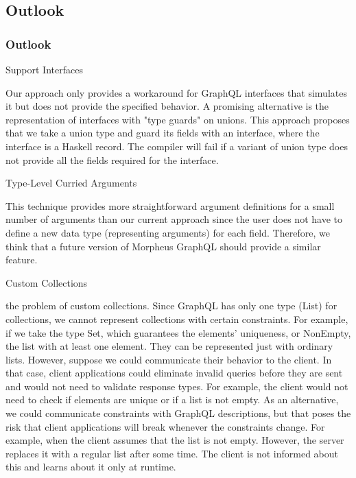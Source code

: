 \subsection{Outlook}
\begin{frame}\frametitle{Outlook}

\begin{block}{Support Interfaces}

Our approach only provides a workaround for GraphQL interfaces that simulates it but does not provide the specified behavior. 
A promising alternative is the representation of interfaces with "type guards" on unions. This approach proposes that we take a union type and guard its fields with an interface, where the interface is a Haskell record. The compiler will fail if a variant of union type does not provide all the fields required for the interface.

\end{block}

\begin{block}{Type-Level Curried Arguments}

This technique provides more straightforward argument definitions for a small number of arguments than our current approach since the user does not have to define a new data type (representing arguments) for each field. Therefore, we think that a future version of Morpheus GraphQL should provide a similar feature. 

\end{block}

\begin{block}{Custom Collections}

the problem of custom collections. Since GraphQL has only one type (List) for collections, we cannot represent collections with certain constraints. For example, if we take the type Set, which guarantees the elements' uniqueness, or NonEmpty, the list with at least one element. They can be represented just with ordinary lists.  However, suppose we could communicate their behavior to the client. In that case, client applications could eliminate invalid queries before they are sent and would not need to validate response types. For example, the client would not need to check if elements are unique or if a list is not empty.  As an alternative, we could communicate constraints with GraphQL descriptions, but that poses the risk that client applications will break whenever the constraints change. For example, when the client assumes that the list is not empty. However, the server replaces it with a regular list after some time. The client is not informed about this and learns about it only at runtime.


\end{block}
\end{frame}
